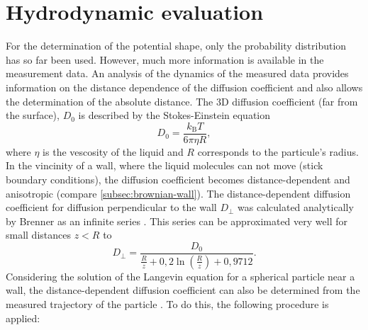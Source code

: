 \documentclass[.../bericht]{subfilies}
\begin{document}
      \section{Hydrodynamic evaluation}
      \label{sec:hydrodynamic}

      For the determination of the potential shape, only the probability distribution has so far been used. However, much more information is available in the measurement data. An analysis of the dynamics of the measured data provides information on the distance dependence of the diffusion coefficient and also allows the determination of the absolute distance. The 3D diffusion coefficient (far from the surface), $D_0$ is described by the Stokes-Einstein equation
      \begin{equation*}
        D_0=\frac{k_\mathrm{B}T}{6\pi\eta R},
      \end{equation*}
      where $\eta$ is the vescosity of the liquid and $R$ corresponds to the particule's radius. In the vincinity of a wall, where the liquid molecules can not move (stick boundary conditions), the diffusion coefficient becomes distance-dependent and anisotropic (compare \cref{subsec:brownian-wall}). The distance-dependent diffusion coefficient for diffusion perpendicular to the wall $D_\perp$ was calculated analytically by Brenner as an infinite series \cite{2}. This series can be approximated very well for small distances $z<R$ to
      \begin{equation}
        D_\perp = \frac{D_0}{\frac{R}{z}+0,2\ln\left(\frac{R}{z}\right) + 0,9712}.
        \label{eq:d-perp-sheet}
      \end{equation}
      Considering the solution of the Langevin equation for a spherical particle near a wall, the distance-dependent diffusion coefficient can also be determined from the measured trajectory of the particle \cite{4}. To do this, the following procedure is applied:
      \medskip
\end{document}
